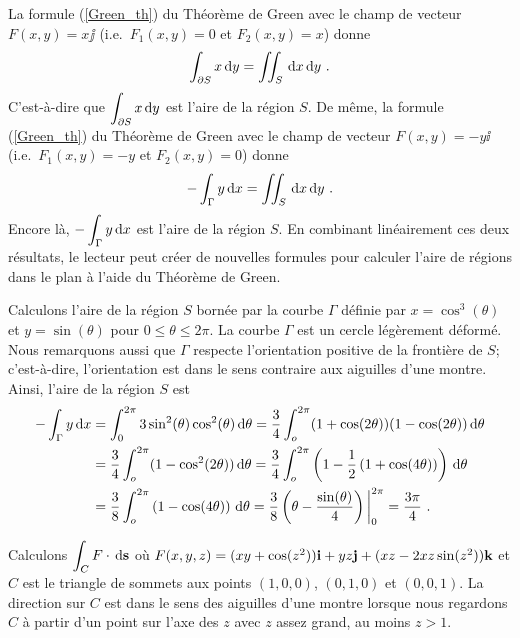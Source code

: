 {\begin{rmk}
La formule (\ref{Green_th}) du Théorème de Green avec le champ de
vecteur $F(x,y) = x \jj$ (i.e.\ $F_1(x,y) =0$ et $F_2(x,y) = x$) donne
\[
  \int_{\partial S} x \,\mathrm{d}y = \iint_{S} \,\mathrm{d}x\,\mathrm{d}y \ .
\]
C'est-à-dire que $\displaystyle \int_{\partial S} x \,\mathrm{d}y$ est l'aire
de la région $S$.  De même, la formule (\ref{Green_th}) du Théorème de
Green avec le champ de vecteur $F(x,y) = -y \ii$
(i.e.\ $F_1(x,y)= -y$ et $F_2(x,y) = 0$) donne
\[
  -\int_\Gamma y \,\mathrm{d}x = \iint_{S} \,\mathrm{d}x\,\mathrm{d}y \ .
\]
Encore là, $\displaystyle -\int_\Gamma y \,\mathrm{d}x$ est l'aire de la
région $S$.  En combinant linéairement ces deux résultats, le lecteur
peut créer de nouvelles formules pour calculer l'aire de régions dans le
plan à l'aide du Théorème de Green.
\end{rmk}

\begin{egg}
Calculons l'aire de la région $S$ bornée par la courbe $\Gamma$
définie par $x = \cos^3(\theta)$ et $y = \sin(\theta)$ pour
$0 \leq \theta \leq 2\pi$.  La courbe $\Gamma$ est un cercle
légèrement déformé.  Nous remarquons aussi que $\Gamma$ respecte
l'orientation positive de la frontière de $S$; c'est-à-dire,
l'orientation est dans le sens contraire aux aiguilles d'une montre.
Ainsi, l'aire de la région $S$ est
\begin{align*}
  -\int_\Gamma y \,\mathrm{d}x &=
\int_0^{2\pi} 3 \sin^2(\theta) \cos^2(\theta) \,\mathrm{d}\theta
=\frac{3}{4} \int_o^{2\pi} (1+\cos(2\theta))(1-\cos(2\theta))\,\mathrm{d}\theta \\
&= \frac{3}{4} \int_o^{2\pi} (1-\cos^2(2\theta))\,\mathrm{d}\theta
= \frac{3}{4} \int_o^{2\pi} \left(1-\frac{1}{2}
\left(1 + \cos(4\theta)\right)\right) \,\mathrm{d}\theta \\
&= \frac{3}{8} \int_o^{2\pi} \left(1-\cos(4\theta)\right) \,\mathrm{d}\theta
= \frac{3}{8} \left( \theta - \frac{\sin(\theta)}{4}\right)\bigg|_0^{2\pi}
= \frac{3\pi}{4} \ .
\end{align*}
\end{egg}

\begin{egg}
Calculons $\displaystyle \int_C F \cdot \,\mathrm{d}\mathbf{s}$ où
$F(x,y,z) = (xy +\cos(z^2))\mathbf{i} + yz \mathbf{j}  + (xz -2xz \sin(z^2))\mathbf{k}$
et $C$ est le triangle de sommets aux points $(1,0,0)$, $(0,1,0)$ et
$(0,0,1)$.  La direction sur $C$ est dans le sens des aiguilles d'une
montre lorsque nous regardons $C$ à partir d'un point sur l'axe des
$z$ avec $z$ assez grand, au moins $z>1$.



\end{egg}}
